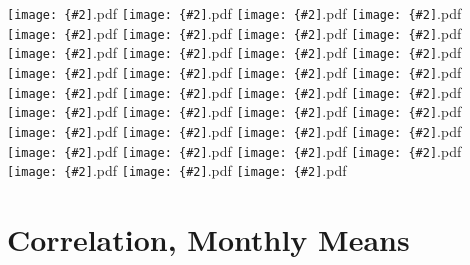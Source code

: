 \documentclass[12pt,a4paper]{article}
\newcommand{\pdffig}[2][0.5]{\texttt{[image: \{\#2]}.pdf}}
\begin{document}
\pdffig[0.5]{Correlation_NthWestAfr_tsfc_sfc_temp}
\pdffig[0.5]{Correlation_NthWestAfr_tsfc_shf}
\pdffig[0.5]{Correlation_NthWestAfr_tsfc_smc}
\pdffig[0.5]{Correlation_SthAfr_tsfc_dlwr}
\pdffig[0.5]{Correlation_SthAfr_tsfc_dswr}
\pdffig[0.5]{Correlation_SthAfr_tsfc_lhf}
\pdffig[0.5]{Correlation_SthAfr_tsfc_precip}
\pdffig[0.5]{Correlation_SthAfr_tsfc_rhum}
\pdffig[0.5]{Correlation_SthAfr_tsfc_sfc_temp}
\pdffig[0.5]{Correlation_SthAfr_tsfc_shf}
\pdffig[0.5]{Correlation_SthAfr_tsfc_smc}
\pdffig[0.5]{Correlation_SthSthAm_tsfc_dlwr}
\pdffig[0.5]{Correlation_SthSthAm_tsfc_dswr}
\pdffig[0.5]{Correlation_SthSthAm_tsfc_lhf}
\pdffig[0.5]{Correlation_SthSthAm_tsfc_precip}
\pdffig[0.5]{Correlation_SthSthAm_tsfc_rhum}
\pdffig[0.5]{Correlation_SthSthAm_tsfc_sfc_temp}
\pdffig[0.5]{Correlation_SthSthAm_tsfc_shf}
\pdffig[0.5]{Correlation_SthSthAm_tsfc_smc}
\pdffig[0.5]{Correlation_TropAfr_tsfc_dlwr}
\pdffig[0.5]{Correlation_TropAfr_tsfc_dswr}
\pdffig[0.5]{Correlation_TropAfr_tsfc_lhf}
\pdffig[0.5]{Correlation_TropAfr_tsfc_precip}
\pdffig[0.5]{Correlation_TropAfr_tsfc_rhum}
\pdffig[0.5]{Correlation_TropAfr_tsfc_sfc_temp}
\pdffig[0.5]{Correlation_TropAfr_tsfc_shf}
\pdffig[0.5]{Correlation_TropAfr_tsfc_smc}
\pdffig[0.5]{Correlation_TropSthAm_tsfc_dlwr}
\pdffig[0.5]{Correlation_TropSthAm_tsfc_dswr}
\pdffig[0.5]{Correlation_TropSthAm_tsfc_lhf}
\pdffig[0.5]{Correlation_TropSthAm_tsfc_precip}
\pdffig[0.5]{Correlation_TropSthAm_tsfc_rhum}
\pdffig[0.5]{Correlation_TropSthAm_tsfc_sfc_temp}
\pdffig[0.5]{Correlation_TropSthAm_tsfc_shf}
\pdffig[0.5]{Correlation_TropSthAm_tsfc_smc}


\section{Correlation, Monthly Means}
\end{document}

